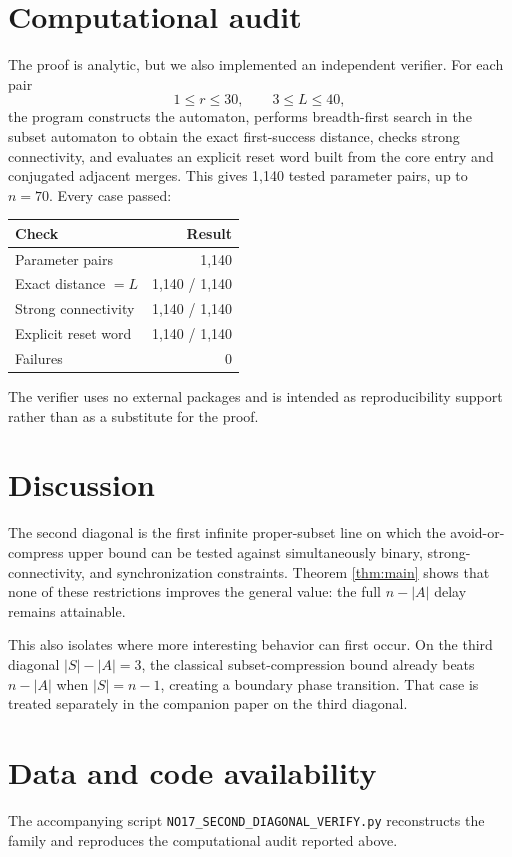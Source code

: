 \documentclass[11pt]{article}
\theoremstyle{definition}
\theoremstyle{remark}
\begin{document}
\section{Computational audit}
The proof is analytic, but we also implemented an independent verifier. For each pair
\[
1\le r\le30,\qquad 3\le L\le40,
\]
the program constructs the automaton, performs breadth-first search in the subset automaton to obtain the exact first-success distance, checks strong connectivity, and evaluates an explicit reset word built from the core entry and conjugated adjacent merges. This gives 1,140 tested parameter pairs, up to $n=70$. Every case passed:

\begin{center}
\begin{tabular}{lr}
\toprule
Check & Result\\
\midrule
Parameter pairs & 1,140\\
Exact distance $=L$ & 1,140 / 1,140\\
Strong connectivity & 1,140 / 1,140\\
Explicit reset word & 1,140 / 1,140\\
Failures & 0\\
\bottomrule
\end{tabular}
\end{center}

The verifier uses no external packages and is intended as reproducibility support rather than as a substitute for the proof.

\section{Discussion}
The second diagonal is the first infinite proper-subset line on which the avoid-or-compress upper bound can be tested against simultaneously binary, strong-connectivity, and synchronization constraints. Theorem \ref{thm:main} shows that none of these restrictions improves the general value: the full $n-|A|$ delay remains attainable.

This also isolates where more interesting behavior can first occur. On the third diagonal $|S|-|A|=3$, the classical subset-compression bound already beats $n-|A|$ when $|S|=n-1$, creating a boundary phase transition. That case is treated separately in the companion paper on the third diagonal.

\section*{Data and code availability}
The accompanying script \texttt{NO17\_SECOND\_DIAGONAL\_VERIFY.py} reconstructs the family and reproduces the computational audit reported above.
\end{document}
